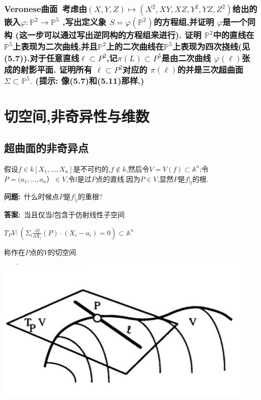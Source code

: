 \documentclass[UTF8]{book}
\begin{document}
	
		\subsection{\textbf{Veronese曲面}\ 考虑由$( X , Y , Z ) \mapsto \left( X ^{2}, XY , XZ , Y ^{2}, YZ , Z ^{2}\right) $给出的嵌入$\varphi: \mathbb{P} ^{2} \rightarrow \mathbb{P} ^{5}$ ,写出定义象 $S =\varphi\left( \mathbb{P} ^{2}\right)$的方程组,并证明 $\varphi$是一个同构 (这一步可以通过写出逆同构的方程组来进行). 证明 $\mathbb{P} ^{2}$中的直线在$\mathbb{P} ^{5}$上表现为二次曲线,并且$\mathbb{P}^{2}$上的二次曲线在$\mathbb{P} ^{5}$上表现为四次挠线(见(5.7)).对于任意直线$\ell \subset P ^{2}$,记$\pi( L ) \subset P ^{5}$是由二次曲线 $\varphi (\ell)$张成的射影平面. 证明所有 $\ell \subset P ^{2}$对应的 $\pi(\ell)$的并是三次超曲面$\Sigma \subset \mathbb{P} ^{5} .$ (提示: 像(5.7)和(5.11)那样.)}
		
\chapter{切空间,非奇异性与维数}
\section{超曲面的非奇异点}
假设$f\in k[X_{1},...,X_{n}]$是不可约的,$f\notin k$,然后令$V=V(f)\subset \mathbb{A}^{n}$;令$P=(a_{1},...,a_{n}）\in V$,令$ l $是过$ P $点的直线.因为$P\in V$,显然$ P $是$f|_{l}$的根.


\textbf{问题:}\ 什么时候点$ P $是$f|_{l}$的重根?


\textbf{答案:}\ 当且仅当$ l $包含于仿射线性子空间


\begin{center}
	$T_{P}V:(\Sigma_{i}\frac{\partial f}{\partial X_{i}}(P)\cdot(X_{i}-a_{i})=0)\subset \mathbb{A}^{n}$
\end{center}


称作在$ P $点的$ V $的切空间.


\begin{center}
	\includegraphics{pic.png}
\end{center}
\end{document}
